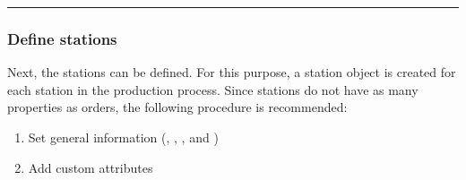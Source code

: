 \documentclass[letterpaper,10pt,english]{sphinxmanual}
\begin{document}
\begin{sphinxVerbatim}[commandchars=\\\{\}]
       \PYG{p}{[[}\PYG{p}{]]}
       
       
       
       \PYG{p}{[}\PYG{p}{],}
       \PYG{p}{[}\PYG{p}{],}
       \PYG{p}{[}\PYG{p}{]}
       
       
       
       \PYG{p}{[}\PYG{p}{],}
       \PYG{p}{[}\PYG{p}{]}
  \PYG{p}{]}
\end{sphinxVerbatim}


\bigskip\hrule\bigskip



\subsubsection{Define stations}
\label{\detokenize{source/Examples/example01:define-stations}}\label{\detokenize{source/Examples/example01:define-station}}
\sphinxAtStartPar
Next, the stations can be defined. For this purpose, a station object is created for each station in the production
process. Since stations do not have as many properties as orders, the following procedure is recommended:
\begin{enumerate}
%
\item {} 
\sphinxAtStartPar
Set general information (, , , and )

\item {} 
\sphinxAtStartPar
Add custom attributes

\end{enumerate}
\end{document}
